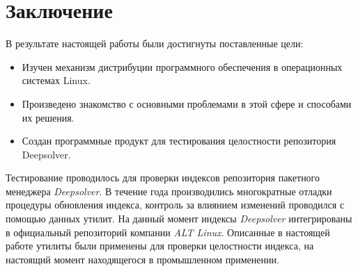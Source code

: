 \section*{Заключение}
В результате настоящей работы были достигнуты поставленные цели:
\begin{itemize}
\item{Изучен механизм дистрибуции программного обеспечения в операционных системах Linux.}
\item{Произведено знакомство с основными проблемами в этой сфере и способами их решения.}
\item{Создан программные продукт для тестирования целостности репозитория Deepsolver.}
\end{itemize}
Тестирование проводилось для проверки индексов репозитория пакетного менеджера \textit{Deepsolver}.
В течение года производились многократные отладки процедуры обновления индекса, контроль
за влиянием изменений проводился с помощью данных утилит.
На данный момент индексы \textit{Deepsolver} интегрированы в официальный репозиторий
компании \textit{ALT Linux}. Описанные в настоящей работе утилиты были применены для 
проверки целостности индекса, на настоящий момент находящегося в промышленном применении.

